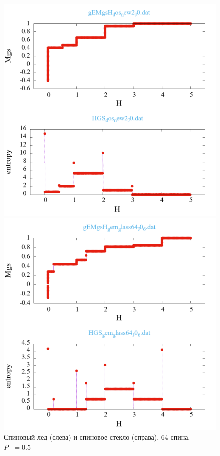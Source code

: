 \documentclass[utf8, babel, sor, jor, amsmath, amssymb, reprint]{elsarticle} %
\begin{document}
\begin{figure}[H]
	\begin{minipage}[h]{0.5\linewidth}
		\includegraphics[width=1\linewidth]{pictures/_multiplot_SI64_J0}
	\end{minipage}
	\hfill
	\begin{minipage}[h]{0.5\linewidth}
		\includegraphics[width=1\linewidth]{pictures/_multiplot_SG64_J0}
	\end{minipage}
	\caption{Спиновый лед (слева) и спиновое стекло (справа), 64 спина, $P_+ = 0.5$}
	\label{fig:_multiplot_SI_SG_64}
\end{figure}
\end{document}
